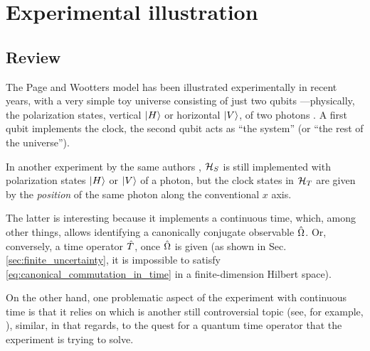 \section{Experimental illustration}
\label{sec:pw:qubit}\label{sec:pw:apps_first}

\subsection{Review}

The Page and Wootters model has been illustrated experimentally in recent years,
with a very simple toy universe consisting of just two qubits
---physically, the polarization states,
vertical $\ket{H}$ or horizontal $\ket{V}$,
of two photons \parencite{Moreva:synthetic,Moreva:illustration}.
A first qubit implements the clock, the second qubit acts as ``the system'' (or
``the rest of the universe'').

In another experiment by the same authors \parencite{Moreva_position}, $\mathcal{H}_S$ is still
implemented with 
polarization states $\ket{H}$ or $\ket{V}$ of a photon, but the clock states in $\mathcal{H}_T$
are given by the \emph{position} of the same photon along the conventional $x$ axis.

The latter is interesting because it implements a continuous time,
which, among other things, allows identifying a canonically conjugate observable
$\hat{\Omega}$. Or, conversely, a time operator $\hat{T}$, once $\hat{\Omega}$ is given
(as shown in Sec. \ref{sec:finite_uncertainty}, it is impossible to satisfy \eqref{eq:canonical_commutation_in_time}
in a finite-dimension Hilbert space).

On the other hand, one problematic aspect of the experiment with continuous time
is that
it relies on  which is another
still controversial topic (see, for example, \cite{HawtonPhotonPosition}),
similar, in that regards, to the quest for a quantum time operator that the experiment is trying to solve.



